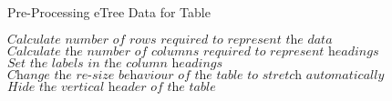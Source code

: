 \documentclass{article}
\begin{document}
\begin{algorithm}
\caption{Pre-Processing eTree Data for Table}
\begin{algorithmic}[1]
\State $\textit{Calculate number of rows required to represent the data}$
\State $\textit{Calculate the number of columns required to represent headings}$
\State $\textit{Set the labels in the column headings}$
\State $\textit{Change the re-size behaviour of the table to stretch automatically}$
\State $\textit{Hide the vertical header of the table}$
\EndProcedure
\end{algorithmic}
\end{algorithm}
\end{document}
